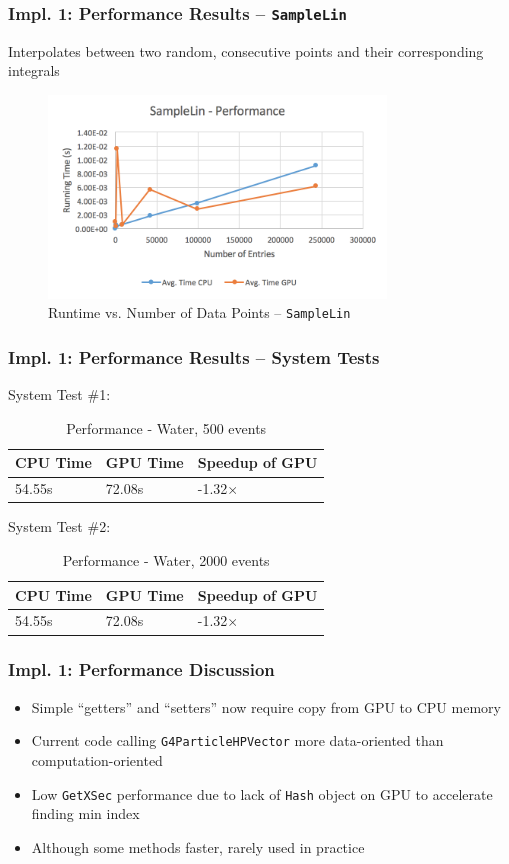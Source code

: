 \documentclass{beamer}
\begin{document}
\begin{frame}
\frametitle{Impl. 1: Performance Results -- \texttt{SampleLin}}
Interpolates between two random, consecutive points and their corresponding integrals
\begin{figure}
\centering
\includegraphics[width=0.8\textwidth]{images/samplelin_line.png}
\caption{Runtime vs. Number of Data Points -- \texttt{SampleLin}}
\end{figure}
\end{frame}

\begin{frame}
\frametitle{Impl. 1: Performance Results -- System Tests}
System Test \#1:
\begin{table}
	\begin{tabular}{lll}
	\toprule
	\bf CPU Time&\bf  GPU Time&\bf Speedup of GPU\\\midrule
	54.55s&72.08s&-1.32$\times$\\\bottomrule
	\end{tabular}
	\caption{Performance - Water, 500 events}
\end{table}
System Test \#2:
\begin{table}
	\begin{tabular}{lll}
	\toprule
	\bf CPU Time&\bf  GPU Time&\bf Speedup of GPU\\\midrule
	54.55s&72.08s&-1.32$\times$\\\bottomrule
	\end{tabular}
	\caption{Performance - Water, 2000 events}
\end{table}
\end{frame}

\begin{frame}
\frametitle{Impl. 1: Performance Discussion}
\begin{itemize}
\item Simple ``getters'' and ``setters'' now require copy from GPU to CPU memory
\item Current code calling \texttt{G4ParticleHPVector} more data-oriented than computation-oriented
\item Low \texttt{GetXSec} performance due to lack of \texttt{Hash} object on GPU to accelerate finding min index
\item Although some methods faster, rarely used in practice
\end{itemize}
\end{frame}
\end{document}
